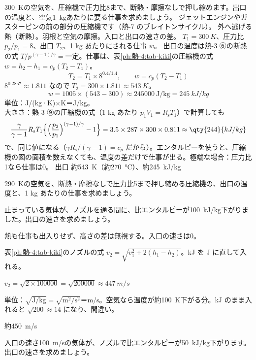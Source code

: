 \begin{phreidai}[空気の圧縮機]
\label{ph:熱-4:ex4}\qty{300}{K}の空気を、圧縮機で圧力比8まで、断熱・摩擦なしで押し縮めます。出口の温度と、空気\qty{1}{kg}あたりに要る仕事を求めましょう。
\phbamen
ジェットエンジンやガスタービンの前の部分の圧縮機です（熱-7 のブレイトンサイクル）。
\phmushi
外へ逃げる熱（断熱）。羽根と空気の摩擦。入口と出口の速さの差。
\phzu
$T_1=\qty{300}{K}$、圧力比 $p_2/p_1=8$、出口 $T_2$、1 kg あたりにされる仕事 $w$。
\phriyu
出口の温度は熱-3 ⑥の断熱の式 $T/p^{(\gamma-1)/\gamma}=$一定。仕事は、表\ref{ph:熱-4:tab-kiki}の圧縮機の式 $w=h_2-h_1=c_p(T_2-T_1)$。
\phtateru
\[ T_2=T_1\times8^{0.4/1.4},\qquad w=c_p(T_2-T_1) \]
\phtoku
$8^{0.2857}\approx1.811$ なので $T_2=300\times1.811\approx\qty{543}{K}$。
\[ w=1005\times(543-300)\approx\num{245000}\ \mathrm{J/kg}=\qty{245}{kJ/kg} \]
\phtashikame
単位：J/(kg·K)×K＝J/kg。\\
大きさ：熱-3 ⑨の圧縮機の式（1 kg あたり $p_1V_1=R_{\mathrm s}T_1$）で計算しても
\[ \frac{\gamma}{\gamma-1}R_{\mathrm s}T_1\Bigl\{\Bigl(\frac{p_2}{p_1}\Bigr)^{(\gamma-1)/\gamma}-1\Bigr\}=3.5\times287\times300\times0.811\approx\qty{244}{kJ/kg} \]
で、同じ値になる（$\gamma R_{\mathrm s}/(\gamma-1)=c_p$ だから）。エンタルピーを使うと、圧縮機の図の面積を数えなくても、温度の差だけで仕事が出る。極端な場合：圧力比1なら仕事は0。
\kotae 出口 約\qty{543}{K}（約\qty{270}{\celsius}）、約\qty{245}{kJ/kg}
\end{phreidai}
\begin{jibun}
\qty{290}{K}の空気を、断熱・摩擦なしで圧力比5まで押し縮める圧縮機の、出口の温度と、1 kg あたりの仕事を求めましょう。
\end{jibun}

\begin{reidai}[ノズルから噴き出す速さ]
\label{ph:熱-4:ex5}止まっている気体が、ノズルを通る間に、比エンタルピーが\qty{100}{kJ/kg}下がりました。出口の速さを求めましょう。
\par{} 熱も仕事も出入りせず、高さの差は無視する。入口の速さは0。
\par\kangaekata 表\ref{ph:熱-4:tab-kiki}のノズルの式 $v_2=\sqrt{v_1^2+2(h_1-h_2)}$。kJ を J に直して入れる。
\par\shiki $v_2=\sqrt{2\times\num{100000}}=\sqrt{\num{200000}}\approx\qty{447}{m/s}$
\par{} 単位：$\sqrt{\text{J/kg}}=\sqrt{\text{m}^2/\text{s}^2}$＝m/s。空気なら温度が約\qty{100}{K}下がる分。kJ のまま入れると $\sqrt{200}\approx14$ になり、間違い。
\par\kotae 約\qty{450}{m/s}
\end{reidai}
\begin{jibun}
入口の速さ\qty{100}{m/s}の気体が、ノズルで比エンタルピーが\qty{50}{kJ/kg}下がります。出口の速さを求めましょう。
\end{jibun}


